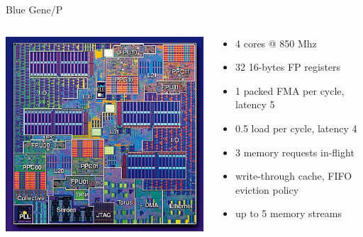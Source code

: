 \begin{frame}{Blue Gene/P}
  \begin{columns}
    \begin{column}{0.6\textwidth}
      \includegraphics[width=\textwidth]{figures/BlueGenePDie}
    \end{column}
    \begin{column}{0.4\textwidth}
      \begin{itemize}
      \item 4 cores @ 850 Mhz
      \item 32 16-bytes FP registers
      \item 1 packed FMA per cycle, latency 5
      \item 0.5 load per cycle, latency 4
      \item 3 memory requests in-flight
      \item write-through cache, FIFO eviction policy
      \item up to 5 memory streams
      \end{itemize}
    \end{column}
  \end{columns}
\end{frame}
